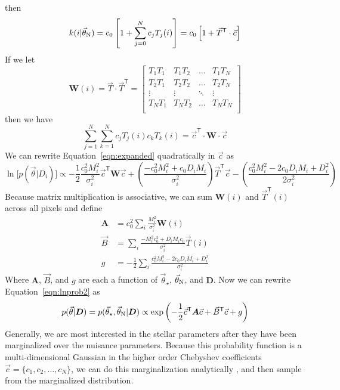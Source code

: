\documentclass[preprint]{aastex} %
\newcommand{\vt}{\vec{\theta}}
\newcommand{\vstar}{\vt_{\star}}
\newcommand{\vN}{\vt_{\rm N}}
\newcommand{\vc}{\vec{c}}
\newcommand{\fMi}{M_i}
\newcommand{\fD}{ {\bm D}}
\newcommand{\fDi}{D_i}
\newcommand{\trans}{\mathsf{T}}
\begin{document}
then 
\begin{equation}
  k(i| \vN) = c_0 \left [ 1 + \sum^N_{j = 0} c_j T_j(i) \right ] = c_0 \left[ 1+ \vec{T}^\trans \cdot \vc \right]
\end{equation}
If we let 
\begin{equation}
  {\bm W}(i) = \vec{T} \cdot \vec{T}^\trans = 
  \begin{bmatrix}
T_1 T_1 & T_1 T_2 &  \hdots & T_1 T_N \\
T_2 T_1 & T_2 T_2 &  \hdots & T_2 T_N \\
\vdots  & \vdots  &  \ddots & \vdots \\
T_N T_1 & T_N T_2 &  \hdots & T_N T_N \\
  \end{bmatrix}
\end{equation}
then we have
\begin{equation}
  \sum_{j =1}^N \sum_{k=1}^N c_j T_j(i) c_k T_k(i) = \vc^\trans \cdot {\bm W} \cdot \vc
\end{equation}
We can rewrite Equation~\ref{eqn:expanded} quadratically in $\vc$ as
\begin{equation}
  \ln \bigl [p(\vt | \fDi) \bigr] \propto - \frac{1}{2} \frac{c_0^2 \fMi^2}{\sigma_i^2}  \vc^\trans {\bm W} \vc + \left (\frac{- c_0^2 \fMi^2 + c_0 \fDi \fMi}{\sigma_i^2} \right ) \vec{T}^\trans \vc -  \left( \frac{c_0^2 \fMi^2 - 2 c_0 \fDi \fMi + \fDi^2}{2 \sigma_i^2} \right)
\end{equation}
Because matrix multiplication is associative, we can sum ${\bm W(i)}$ and $\vec{T}^\trans(i)$ across all pixels and define
\begin{align}
  {\bm A} &= c_0^2 \sum_{i} \frac{\fMi^2}{\sigma_i^2} {\bm W}(i) \\
  \vec{B} &= \sum_{i} \frac{-\fMi^2 c_0^2 + \fDi \fMi c_0}{\sigma_i^2} \vec{T}(i)\\
  g &= -\frac{1}{2} \sum_{i} \frac{c_0^2 \fMi^2 - 2 c_0 \fDi \fMi + \fDi^2}{\sigma_i^2} 
\end{align}
Where ${\bm A}$, $\vec{B}$, and $g$ are each a function of $\vstar$, $\vN$, and $\fD$. Now we can rewrite Equation~\ref{eqn:lnprob2} as 
\begin{equation}
  p(\vt | \fD) = p(\vstar, \vN | \fD) \propto \exp \left ( - \frac{1}{2} \vc^\trans {\bm A} \vc + \vec{B}^\trans \vc + g \right )
  \label{eqn:lnprob_matrix}
\end{equation}
Generally, we are most interested in the stellar parameters after they have been marginalized over the nuisance parameters. Because this probability function is a multi-dimensional Gaussian in the higher order Chebyshev coefficients $\vc = \{c_1, c_2, \ldots, c_N \}$, we can do this marginalization analytically \citep{sgd+09}, and then sample from the marginalized distribution. 
\end{document}
